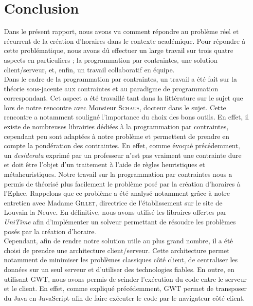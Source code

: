\chapter*{Conclusion}

Dans le présent rapport, nous avons vu comment répondre au problème réel et récurrent de la création d'horaires dans le contexte académique. Pour répondre à cette problématique, nous avons dû effectuer un large travail sur trois quatre aspects en particuliers ; la programmation par contraintes, une solution client/serveur, et, enfin, un travail collaboratif en équipe.\\
\newline
\indent
Dans le cadre de la programmation par contraintes, un travail a été fait sur la théorie sous-jacente aux contraintes et au paradigme de programmation correspondant. Cet aspect a été travaillé tant dans la littérature sur le sujet que lors de notre rencontre avec Monsieur  \textsc{Schaus}, docteur dans le sujet.
Cette rencontre a notamment souligné l'importance du choix des bons outils. En effet, il existe de nombreuses librairies dédiées à la programmation par contraintes, cependant peu sont adaptées à notre problème et permettent de prendre en compte la pondération des contraintes. En effet, comme évoqué précédemment, un \textit{desiderata} exprimé par un professeur n'est pas vraiment une contrainte dure et doit être l'objet d'un traitement à l'aide de règles heuristiques et métaheuristiques.
\newline
\indent
Notre travail sur la programmation par contraintes nous a permis de théorisé plus facilement le problème posé par la création d'horaires à l'Ephec. Rappelons que ce problème a été analysé notamment grâce à notre entretien avec Madame \textsc{Gillet}, directrice de l'établissement sur le site de Louvain-la-Neuve.
En définitive, nous avons utilisé les libraires offertes par \textit{UniTime} afin d'implémenter un solveur permettant de résoudre les problèmes posés par la création d'horaire.\\
\newline
\indent
Cependant, afin de rendre notre solution utile au plus grand nombre, il a été choisi de prendre une architecture client/serveur. Cette architecture permet notamment de minimiser les problèmes classiques côté client, de centraliser les données sur un seul serveur et d'utiliser des technologies fiables.
En outre, en utilisant GWT, nous avons permis de scinder l'exécution du code entre le serveur et le client. En effet, comme expliqué précédemment, GWT permet de transposer du Java en JavaScript afin de faire exécuter le code par le navigateur côté client.
